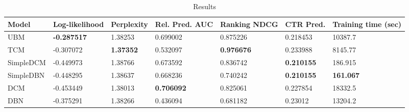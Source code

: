 \begin{table}[h]
	\begin{tabular}{@{}lllllll@{}}
		\toprule
		Model     & Log-likelihood     & Perplexity       & Rel. Pred. AUC & Ranking NDCG      & CTR Pred.    & Training time (sec) \\ \midrule
		UBM       & \textbf{-0.287517} & 1.38253          & 0.699002                 & 0.875226          & 0.218453          & 10387.7                 \\
		TCM       & -0.307072          & \textbf{1.37352} & 0.532097                 & \textbf{0.976676} & 0.233988          & 8145.77                 \\
		SimpleDCM & -0.449973          & 1.38766          & 0.673592                 & 0.836742          & \textbf{0.210155} & 186.915                 \\
		SimpleDBN & -0.448295          & 1.38637          & 0.668236                 & 0.740242          & \textbf{0.210155} & \textbf{161.067}        \\
		DCM       & -0.453449          & 1.38013          & \textbf{0.706092}        & 0.825061          & 0.227854          & 18332.5                 \\
		DBN       & -0.375291          & 1.38266          & 0.436094                 & 0.681182          & 0.23012           & 13204.2                 \\ \bottomrule
	\end{tabular}
	\caption{Results}
	\label{table:results}
\end{table}
